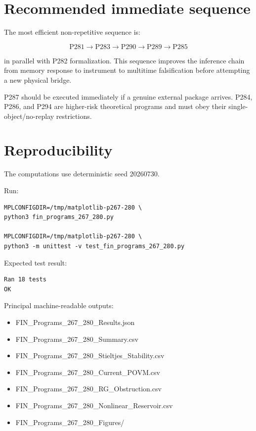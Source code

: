 \documentclass[11pt,a4paper,openany]{report}
\begin{document}
\chapter{Recommended immediate sequence}

The most efficient non-repetitive sequence is:

\[
\boxed{
\text{P281}
\to
\text{P283}
\to
\text{P290}
\to
\text{P289}
\to
\text{P285}
}
\]

in parallel with P282 formalization. This sequence improves the inference chain from memory response to instrument to multitime falsification before attempting a new physical bridge.

P287 should be executed immediately if a genuine external package arrives. P284, P286, and P294 are higher-risk theoretical programs and must obey their single-object/\allowbreak{}no-replay restrictions.

\chapter{Reproducibility}

The computations use deterministic seed 20260730.

Run:

\begin{Verbatim}[fontsize=\small]
MPLCONFIGDIR=/tmp/matplotlib-p267-280 \
python3 fin_programs_267_280.py

MPLCONFIGDIR=/tmp/matplotlib-p267-280 \
python3 -m unittest -v test_fin_programs_267_280.py
\end{Verbatim}

Expected test result:

\begin{Verbatim}[fontsize=\small]
Ran 18 tests
OK
\end{Verbatim}

Principal machine-readable outputs:

\begin{itemize}
\item 
FIN\_Programs\_267\_280\_Results.json

\item 
FIN\_Programs\_267\_280\_Summary.csv

\item 
FIN\_Programs\_267\_280\_Stieltjes\_Stability.csv

\item 
FIN\_Programs\_267\_280\_Current\_POVM.csv

\item 
FIN\_Programs\_267\_280\_RG\_Obstruction.csv

\item 
FIN\_Programs\_267\_280\_Nonlinear\_Reservoir.csv

\item 
FIN\_Programs\_267\_280\_Figures/\allowbreak{}

\end{itemize}
\end{document}
